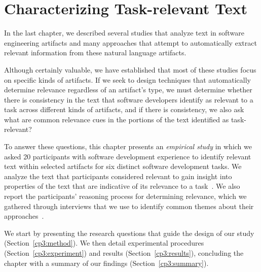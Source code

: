\setcounter{chapter}{2}


\chapter{Characterizing Task-relevant Text}
\label{ch:characterizing}



In the last chapter,
we described several studies that analyze text in software engineering artifacts
and many approaches that attempt to automatically extract relevant information from
these natural language artifacts.


Although certainly valuable,
we have established that
most of these studies focus on specific kinds of artifacts.
If we seek to design
techniques that automatically determine relevance regardless of an artifact's type,
we must determine
whether
there is consistency in the text
that software developers identify as relevant to a task across
different kinds of artifacts, and if there is consistency, we also ask
what are common relevance cues in the portions of
the text identified as task-relevant?





To answer these questions, 
this chapter presents an
\textit{empirical study} in which we asked 20 participants with
software development experience to identify relevant text within
selected artifacts for six distinct software development tasks.
We analyze the text that participants considered relevant 
to gain insight into properties of the text 
that are indicative of its relevance to a task~\cite{das2014frame, jurafsky2014speech}. 
We also report the participants'
reasoning process for determining relevance,
which we gathered through interviews
that we use to identify
common themes about their approaches~\cite{spencer2009sorting}.



We start by presenting the research questions that guide 
the design of our study (Section~\ref{cp3:method}).
We then detail experimental procedures (Section~\ref{cp3:experiment}) 
and results (Section~\ref{cp3:results}),
concluding the chapter with a summary of our findings (Section~\ref{cp3:summary}).



% 
% 
% 
% 





